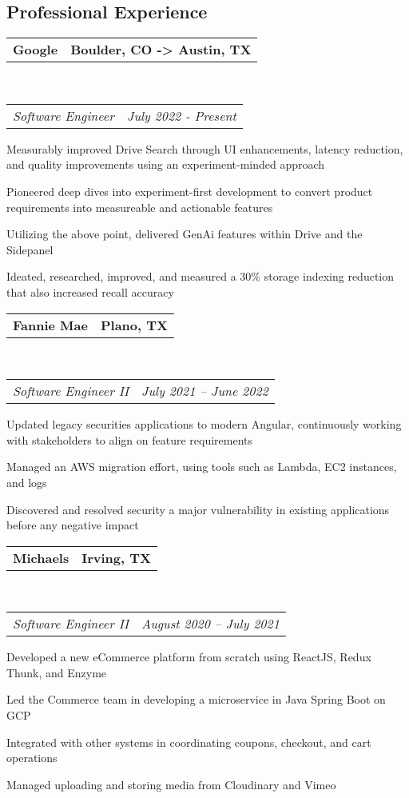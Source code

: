 \documentclass[10pt,letterpaper]{article}
\makeatletter
\newenvironment{indentsection}[1]%
{\begin{list}{}%
	{\setlength{\leftmargin}{#1}}%
	\item[]%
}
{\end{list}}
\newcommand{\headerrow}[2]
{\begin{tabular*}{\linewidth}{l@{\extracolsep{\fill}}r}
	#1 &
	#2 \\
\end{tabular*}}
\makeatother
\begin{document}
\subsection*{Professional Experience}
\begin{indentsection}{\parindent}
	\vspace{-0.4em}
	\headerrow
		{\textbf{Google}}
		{\textbf{Boulder, CO -> Austin, TX}}
	\\
	\headerrow
		{\emph{Software Engineer}}
		{\emph{July 2022 - Present}}
	\begin{itemize*}
		\item Measurably improved Drive Search through UI enhancements, latency reduction, and quality improvements using an experiment-minded approach
		\item Pioneered deep dives into experiment-first development to convert product requirements into measureable and actionable features
		\item Utilizing the above point, delivered GenAi features within Drive and the Sidepanel
		\item Ideated, researched, improved, and measured a 30\% storage indexing reduction that also increased recall accuracy
	\end{itemize*}
\end{indentsection}
\begin{indentsection}{\parindent}
	\vspace{-0.4em}
	\headerrow
		{\textbf{Fannie Mae}}
		{\textbf{Plano, TX}}
	\\
	\headerrow
		{\emph{Software Engineer II}}
		{\emph{July 2021 -- June 2022}}
	\begin{itemize*}
		\item Updated legacy securities applications to modern Angular, continuously working with stakeholders to align on feature requirements 
		\item Managed an AWS migration effort, using tools such as Lambda, EC2 instances, and logs
		\item Discovered and resolved security a major vulnerability in existing applications before any negative impact
	\end{itemize*}
\end{indentsection}
\begin{indentsection}{\parindent}
	\vspace{-0.4em}
	\headerrow
		{\textbf{Michaels}}
		{\textbf{Irving, TX}}
	\\
	\headerrow
		{\emph{Software Engineer II}}
		{\emph{August 2020 -- July 2021}}
	\begin{itemize*}
		\item Developed a new eCommerce platform from scratch using ReactJS, Redux Thunk, and Enzyme
		\item Led the Commerce team in developing a microservice in Java Spring Boot on GCP
		\item Integrated with other systems in coordinating coupons, checkout, and cart operations
		\item Managed uploading and storing media from Cloudinary and Vimeo
	\end{itemize*}
\end{indentsection}
\end{document}

